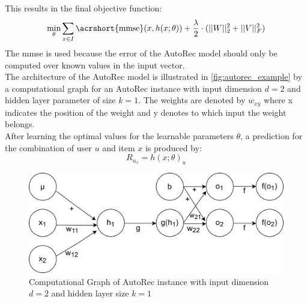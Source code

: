 This results in the final objective function:\\
\begin{equation}
    \min_{\theta}\sum_{x \in I} \text{\acrshort{mmse}}(x, h(x;\theta)) + \frac{\lambda}{2} \cdot (||W||^{2}_{2} + ||V||^{2}_{F})
\end{equation}
The \acrshort{mmse} is used because the error of the AutoRec model should only be computed over known values in the input vector.\\
The architecture of the AutoRec model is illustrated in \autoref{fig:autorec_example} by a computational graph for an AutoRec instance with input dimension $d = 2$ and hidden layer parameter of size $k=1$. The weights are denoted by $w_{xy}$ where x indicates the position of the weight and y denotes to which input the weight belongs.\\
After learning the optimal values for the learnable parameters $\theta$, a prediction for the combination of user $u$ and item $x$ is produced by:\\
\begin{equation}
    R_u_x = h(x; \theta)_u
\end{equation}

\begin{figure}[!ht]
    \centering
    \includegraphics[width=1\textwidth]{images/computational_graph.jpg}
    \caption{Computational Graph of AutoRec instance with input dimension $d=2$ and hidden layer size $k=1$}
    \label{fig:autorec_example}
\end{figure}

